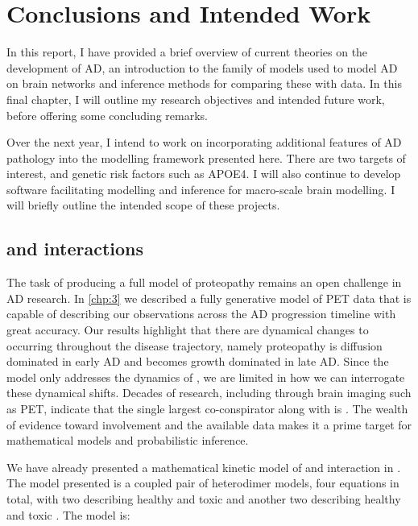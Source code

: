 \chapter{Conclusions and Intended Work}
\label{chp:4}
In this report, I have provided a brief overview of current theories on the
development of AD, an introduction to the family of models used to model AD on
brain networks and inference methods for comparing these with data. In this
final chapter, I will outline my research objectives and intended future work,
before offering some concluding remarks. 

Over the next year, I intend to work on incorporating additional features of AD 
pathology into the modelling framework presented here. There are two targets of 
interest, \AB and genetic risk factors such as APOE4. I will also continue 
to develop software facilitating modelling and inference for macro-scale 
brain modelling. I will briefly outline the intended scope of these projects. 

\section{\TP and \AB interactions}

The task of producing a full model of proteopathy remains an open challenge in 
AD research. In \cref{chp:3} we described a fully generative model of  
\TP PET data that is capable of describing our observations across the AD
progression timeline with great accuracy. Our results highlight that there are
dynamical changes to \TP occurring throughout the disease trajectory, namely \TP
proteopathy is diffusion dominated in early AD and becomes growth dominated in
late AD. Since the model only addresses the dynamics of \TP, we are limited in
how we can interrogate these dynamical shifts. Decades of research, including
through brain imaging such as PET, indicate that the single largest
co-conspirator along with \TP is \AB
\cite{pooler2015,bennett2017enhanced,he2018amyloid,ossenkoppele2022amyloid}. The
wealth of evidence toward \AB involvement and the available data makes it a
prime target for mathematical models and probabilistic inference. 

We have already presented a mathematical kinetic model of \TP and \AB interaction 
in \cite{thompson2020}. The model presented is a coupled pair of heterodimer 
models, four equations in total, with two describing healthy and toxic \AB and 
another two describing healthy and toxic \TP. The model is: 

